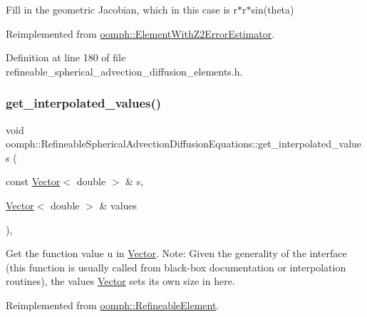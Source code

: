 Fill in the geometric Jacobian, which in this case is r$\ast$r$\ast$sin(theta) 



Reimplemented from \hyperlink{classoomph_1_1ElementWithZ2ErrorEstimator_ad2add457436f34d0d4b9e48900be309c}{oomph\+::\+Element\+With\+Z2\+Error\+Estimator}.



Definition at line 180 of file refineable\+\_\+spherical\+\_\+advection\+\_\+diffusion\+\_\+elements.\+h.

\mbox{\label{classoomph_1_1RefineableSphericalAdvectionDiffusionEquations_ae8ee03bbf706d765a3756a3a2f8804f9}} 
\subsubsection{\texorpdfstring{get\+\_\+interpolated\+\_\+values()}{get\_interpolated\_values()}\hspace{0.1cm}{\footnotesize\ttfamily [1/2]}}
{\footnotesize\ttfamily void oomph\+::\+Refineable\+Spherical\+Advection\+Diffusion\+Equations\+::get\+\_\+interpolated\+\_\+values (\begin{DoxyParamCaption}\item[{const \hyperlink{classoomph_1_1Vector}{Vector}$<$ double $>$ \&}]{s,  }\item[{\hyperlink{classoomph_1_1Vector}{Vector}$<$ double $>$ \&}]{values }\end{DoxyParamCaption})\hspace{0.3cm}{\ttfamily [inline]}, {\ttfamily [virtual]}}



Get the function value u in \hyperlink{classoomph_1_1Vector}{Vector}. Note\+: Given the generality of the interface (this function is usually called from black-\/box documentation or interpolation routines), the values \hyperlink{classoomph_1_1Vector}{Vector} sets its own size in here. 



Reimplemented from \hyperlink{classoomph_1_1RefineableElement_ad9a4f92880668a2373326d8306365c43}{oomph\+::\+Refineable\+Element}.



